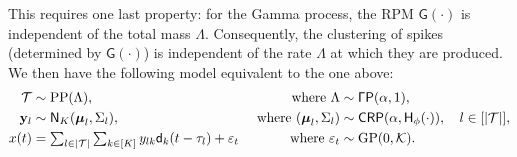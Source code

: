 This requires one last property: for the Gamma process, the RPM $\mathsf{G}(\cdot)$ is independent of the total mass $\Lambda$. 
Consequently, the clustering of spikes (determined by $\mathsf{G}(\cdot)$) is independent of the rate $\Lambda$ at which they are produced. We then have
 the following model equivalent to the one above:
\begin{subequations}
\begin{align}
  \mc{T} &\sim \PP(\Lambda), \qquad &\text{ where } \Lambda  &\sim \mathsf{\Gamma P}(\alpha, 1),
   \\
  \by_l &\sim \mathsf{N}_K(\mb{\mu}_{l}, \Sigma_{l}), \qquad &\text{ where } (\mb{\mu}_{l}, \Sigma_{l})  &\sim {\mathsf{CRP}}(\alpha, \mathsf{H}_{\phi}(\cdot)), \quad  l \in [|\mc{T}|],   \label{eq:CRP}\\
  x(t) &=   \textstyle{\sum_{l \in |\mc{T}|}} \sum_{k \in [K]} y_{lk} \mathsf{d}_k(t - \tau_{l}) + \eps_t  &\text{ where }  \eps_t &\sim \text{GP}(0,\mathcal{K}).  \label{eq:CRP_mix}  %
\end{align} \label{eq:marked_pp}
\end{subequations}


